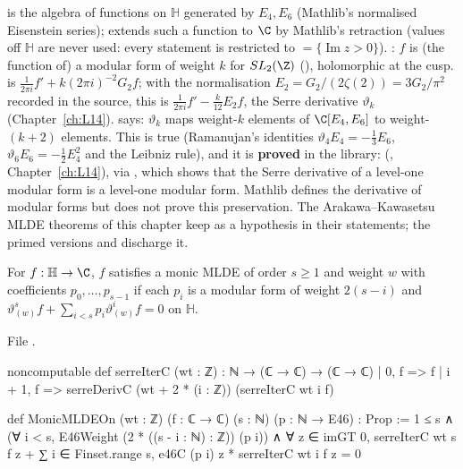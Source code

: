 \begin{dictionary}
 is the algebra of functions on $\mathbb H$ generated by $E_4,E_6$ (Mathlib's normalised Eisenstein series);
 extends such a function to $\C$ by Mathlib's retraction (values off $\mathbb H$ are never used: every
statement is restricted to  $=\{\operatorname{Im}z>0\}$). : $f$ is (the function of) a
modular form of weight $k$ for $SL_2(\Z)$ (), holomorphic at the cusp.  is
$\frac{1}{2\pi i}f' + k(2\pi i)^{-2}G_2f$; with the normalisation $E_2 = G_2/(2\zeta(2)) = 3G_2/\pi^2$ recorded in
the source, this is $\frac1{2\pi i}f' - \frac{k}{12}E_2f$, the Serre derivative $\vartheta_k$ (Chapter~\ref{ch:L14}).
 says: $\vartheta_k$ maps weight-$k$ elements of $\C[E_4,E_6]$ to weight-$(k+2)$ elements. This is true
(Ramanujan's identities $\vartheta_4E_4 = -\frac13E_6$, $\vartheta_6E_6 = -\frac12E_4^2$ and the Leibniz rule), and it is
\textbf{proved} in the library:  (,
Chapter~\ref{ch:L14}), via , which shows that the Serre derivative of a level-one modular form is a
level-one modular form. Mathlib defines the derivative of modular forms but does not prove this preservation. The
Arakawa--Kawasetsu MLDE theorems of this chapter keep  as a hypothesis  in their
statements; the primed versions
\allowbreak{}\allowbreak{}\allowbreak{}\allowbreak{}
and \allowbreak{}\allowbreak{}\allowbreak{}\allowbreak{}
discharge it.
\end{dictionary}

\begin{definition}\label{l16:def:mlde}
For $f:\mathbb H\to\C$, $f$ satisfies a monic MLDE of order $s\ge1$ and weight $w$ with coefficients $p_0,\dots,p_{s-1}$
if each $p_i$ is a modular form of weight $2(s-i)$ and $\vartheta^s_{(w)}f + \sum_{i<s}p_i\vartheta^i_{(w)}f = 0$ on $\mathbb H$.
\end{definition}
\noindent File .
\begin{leancode}
noncomputable def serreIterC (wt : ℤ) : ℕ → (ℂ → ℂ) → (ℂ → ℂ)
  | 0, f => f
  | i + 1, f => serreDerivC (wt + 2 * (i : ℤ)) (serreIterC wt i f)

def MonicMLDEOn (wt : ℤ) (f : ℂ → ℂ) (s : ℕ) (p : ℕ → E46) : Prop :=
  1 ≤ s ∧
    (∀ i < s, E46Weight (2 * ((s - i : ℕ) : ℤ)) (p i)) ∧
    ∀ z ∈ imGT 0, serreIterC wt s f z
      + ∑ i ∈ Finset.range s, e46C (p i) z * serreIterC wt i f z = 0
\end{leancode}

